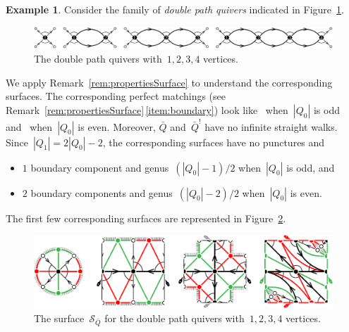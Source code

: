 \documentclass{amsart}
\theoremstyle{definition}
\newtheorem{example}[theorem]{Example}
\newcommand{\fref}[1]{Figure~\ref{#1}} %
\newcommand{\darkblue}{\color{darkblue}} %
\newcommand{\defn}[1]{\textsl{\darkblue #1}} %
\newcommand{\surface}{\mathcal{S}} %
\newcommand{\koszul}{^!} %
\begin{document}
\begin{example}
\label{exm:doublePath}
Consider the family of \defn{double path quivers} indicated in \fref{fig:doublePathsQuivers}.

\begin{figure}[h]
	\capstart
	\centerline{\includegraphics[scale=.45]{doublePathsQuivers}}
	\caption{The double path quivers with~$1, 2, 3, 4$ vertices.}
	\label{fig:doublePathsQuivers}
\end{figure}

We apply Remark~\ref{rem:propertiesSurface} to understand the corresponding surfaces.
The corresponding perfect matchings (see Remark~\ref{rem:propertiesSurface}\,\eqref{item:boundary}) look like~ when~$|Q_0|$ is odd and~ when~$|Q_0|$ is even.
Moreover, $\bar Q$ and~$\bar Q\koszul$ have no infinite straight walks.
Since~$|Q_1| = 2|Q_0|-2$, the corresponding surfaces have no punctures and
\begin{itemize}
\item $1$ boundary component and genus~$(|Q_0|-1)/2$ when~$|Q_0|$ is odd, and 
\item $2$ boundary components and genus~$(|Q_0|-2)/2$ when~$|Q_0|$ is even.
\end{itemize}
The first few corresponding surfaces are represented in \fref{fig:doublePathsSurfaces}.

\begin{figure}[H]
	\capstart
	\centerline{\includegraphics[scale=.7]{doublePathsSurfaces}}
	\caption{The surface~$\surface_{\bar Q}$ for the double path quivers with~$1, 2, 3, 4$ vertices.}
	\label{fig:doublePathsSurfaces}
\end{figure}
\end{example}
\end{document}
